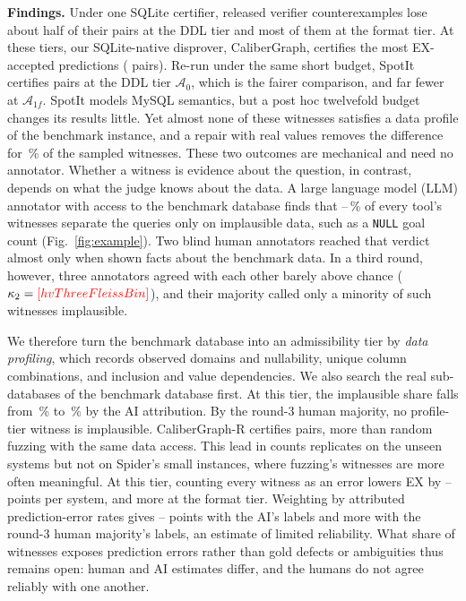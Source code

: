 \textbf{Findings.} Under one SQLite certifier, released verifier counterexamples lose about half of their pairs at the DDL tier and most of them at the format tier. At these tiers, our SQLite-native disprover, CaliberGraph, certifies the most EX-accepted predictions ( pairs). Re-run under the same short budget, SpotIt certifies  pairs at the DDL tier $\mathcal A_0$, which is the fairer comparison, and far fewer at $\mathcal A_{1f}$. SpotIt models MySQL semantics, but a post hoc twelvefold budget changes its results little. Yet almost none of these witnesses satisfies a data profile of the benchmark instance, and a repair with real values removes the difference for \,\% of the sampled witnesses. These two outcomes are mechanical and need no annotator. Whether a witness is evidence about the question, in contrast, depends on what the judge knows about the data. A large language model (LLM) annotator with access to the benchmark database finds that --\,\% of every tool's witnesses separate the queries only on implausible data, such as a \texttt{NULL} goal count (Fig.~\ref{fig:example}). Two blind human annotators reached that verdict almost only when shown facts about the benchmark data. In a third round, however, three annotators agreed with each other barely above chance ($\kappa_2=\V{hvThreeFleissBin}$), and their majority called only a minority of such witnesses implausible.

We therefore turn the benchmark database into an admissibility tier by \emph{data profiling}, which records observed domains and nullability, unique column combinations, and inclusion and value dependencies. We also search the real sub-databases of the benchmark database first. At this tier, the implausible share falls from \,\% to \,\% by the AI attribution. By the round-3 human majority, no profile-tier witness is implausible. CaliberGraph-R certifies  pairs, more than random fuzzing with the same data access. This lead in counts replicates on the unseen systems but not on Spider's small instances, where fuzzing's witnesses are more often meaningful. At this tier, counting every witness as an error lowers EX by -- points per system, and more at the format tier. Weighting by attributed prediction-error rates gives -- points with the AI's labels and more with the round-3 human majority's labels, an estimate of limited reliability. What share of witnesses exposes prediction errors rather than gold defects or ambiguities thus remains open: human and AI estimates differ, and the humans do not agree reliably with one another.

